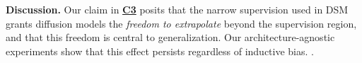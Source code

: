 \textbf{Discussion.} Our claim in \hyperref[claim:freedom]{\textbf{C3}} posits that the narrow supervision used in DSM grants diffusion models the \emph{freedom to extrapolate} beyond the supervision region, and that this freedom is central to generalization. Our architecture-agnostic experiments show that this effect persists regardless of inductive bias.  .